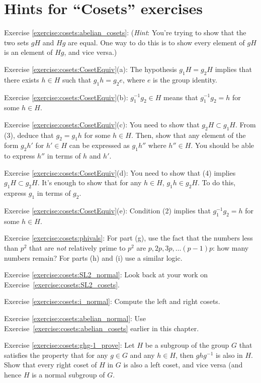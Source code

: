 \section{Hints for ``Cosets'' exercises}\label{sec:cosets:hints} 


\noindent Exercise \ref{exercise:cosets:abelian_cosets}:  (\emph{Hint}: You're trying to show that the two sets $gH$ and $Hg$ are equal. One way to do this is to show every element of $gH$ is an element of $Hg$, and vice versa.)


\noindent Exercise \ref{exercise:cosets:CosetEquiv}(a): The hypothesis $g_1 H = g_2 H$ implies that there exists $h \in H$ such that $g_1 h  = g_2 e$, where $e$ is the group identity. 

\noindent Exercise \ref{exercise:cosets:CosetEquiv}(b):   $g_1^{-1} g_2 \in H$ means that $g_1^{-1} g_2 = h$ for some $h \in H$. 

\noindent Exercise \ref{exercise:cosets:CosetEquiv}(c):   You need to show that $g_2 H \subset g_1 H$. From (3), deduce that $g_2 = g_1 h$ for some $h \in H$. Then, show that any element of the form $g_2 h'$ for $h' \in H$ can be expressed as $g_1 h''$ where $h'' \in H$. You should be able to express $h''$ in terms of $h$ and $h'$.

\noindent Exercise \ref{exercise:cosets:CosetEquiv}(d):   You need to show that (4) implies $g_1H \subset g_2H$. It's enough to show that for any $h \in H$,  $g_1 h \in g_2 H$. To do this, express $g_1$ in terms of $g_2$. 

\noindent Exercise \ref{exercise:cosets:CosetEquiv}(e):    Condition (2) implies that $g_1^{-1} g_2 = h$ for some $h \in H$.

\noindent Exercise \ref{exercise:cosets:phivals}:   For part (g), use the fact that the numbers less than $p^2$ that are \emph{not} relatively prime to $p^2$ are $p, 2p, 3p, \ldots (p-1)p$: how many numbers remain? For parts (h) and (i) use a similar logic.
 
\noindent Exercise \ref{exercise:cosets:SL2_normal}:
Look back at your work on Exercise~\ref{exercise:cosets:SL2_cosets}.

\noindent Exercise \ref{exercise:cosets:i_normal}:
Compute the left and right cosets.

\noindent Exercise \ref{exercise:cosets:abelian_normal}: Use  Exercise~\ref{exercise:cosets:abelian_cosets} earlier in this chapter.

\noindent Exercise \ref{exercise:cosets:ghg-1_prove}: Let $H$ be a subgroup of the group $G$ that satisfies the property that  for any $g \in G$ and any $h \in H$, then $ghg^{-1}$ is also in $H$. Show that every right coset of $H$ in $G$ is also a left coset, and vice versa (and hence $H$ is a normal subgroup of $G$.

